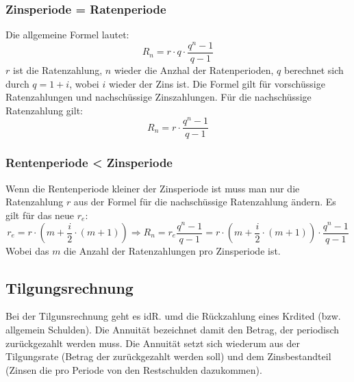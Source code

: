 \documentclass[a4paper]{scrartcl}
\begin{document}
            \subsubsection{Zinsperiode = Ratenperiode}
                Die allgemeine Formel lautet: 
                \begin{equation*}
                    R_n = r \cdot q \cdot \frac{q^n - 1}{q-1}
                \end{equation*}
                \(r\) ist die Ratenzahlung, \(n\) wieder die Anzhal der Ratenperioden, \(q\) berechnet sich durch \(q = 1 +i\), wobei \(i\) wieder der Zins ist. Die Formel gilt für vorschüssige Ratenzahlungen und nachschüssige Zinszahlungen.
                Für die nachschüssige Ratenzahlung gilt: 
                \begin{equation*}
                    R_n = r \cdot \frac{q^n - 1}{q - 1}
                \end{equation*}
            \subsubsection{Rentenperiode < Zinsperiode}
                Wenn die Rentenperiode kleiner der Zinsperiode ist muss man nur die Ratenzahlung \(r\) aus der Formel für die nachschüssige Ratenzahlung ändern. Es gilt für das neue \(r_e\):
                \begin{equation*}
                    r_e = r \cdot (m + \frac{i}{2} \cdot (m + 1)) \Rightarrow R_n = r_e \frac{q^n-1}{q-1} = r \cdot (m + \frac{i}{2} \cdot (m + 1)) \cdot \frac{q^n-1}{q-1}
                \end{equation*}
                Wobei das \(m\) die Anzahl der Ratenzahlungen pro Zinsperiode ist.
        
        \subsection{Tilgungsrechnung}
        Bei der Tilgunsrechnung geht es idR. umd die Rückzahlung eines Krdited (bzw. allgemein Schulden). Die Annuität bezeichnet damit den Betrag, der periodisch zurückgezahlt werden muss.
        Die Annuität setzt sich wiederum aus der Tilgungsrate (Betrag der zurückgezahlt werden soll) und dem Zinsbestandteil (Zinsen die pro Periode von den Restschulden dazukommen).
\end{document}
